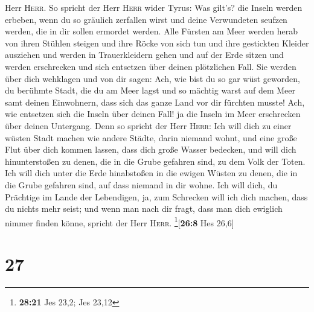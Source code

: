 Herr \textsc{Herr}.  So spricht der Herr \textsc{Herr}
wider Tyrus: Was gilt's? die Inseln werden erbeben, wenn du so gräulich
zerfallen wirst und deine Verwundeten seufzen werden, die in dir sollen
ermordet werden.  Alle Fürsten am Meer werden herab von
ihren Stühlen steigen und ihre Röcke von sich tun und ihre gestickten
Kleider ausziehen und werden in Trauerkleidern gehen und auf der Erde
sitzen und werden erschrecken und sich entsetzen über deinen plötzlichen
Fall.  Sie werden über dich wehklagen und von dir sagen:
Ach, wie bist du so gar wüst geworden, du berühmte Stadt, die du am Meer
lagst und so mächtig warst auf dem Meer samt deinen Einwohnern, dass
sich das ganze Land vor dir fürchten musste!  Ach, wie
entsetzen sich die Inseln über deinen Fall! ja die Inseln im Meer
erschrecken über deinen Untergang.  Denn so spricht der
Herr \textsc{Herr}: Ich will dich zu einer wüsten Stadt machen wie
andere Städte, darin niemand wohnt, und eine große Flut über dich kommen
lassen, dass dich große Wasser bedecken,  und will dich
hinunterstoßen zu denen, die in die Grube gefahren sind, zu dem Volk der
Toten. Ich will dich unter die Erde hinabstoßen in die ewigen Wüsten zu
denen, die in die Grube gefahren sind, auf dass niemand in dir wohne.
Ich will dich, du Prächtige im Lande der Lebendigen,  ja,
zum Schrecken will ich dich machen, dass du nichts mehr seist; und wenn
man nach dir fragt, dass man dich ewiglich nimmer finden könne, spricht
der Herr \textsc{Herr}. \footnote{\textbf{28:21} Jes 23,2; Jes 23,12}{[}\textbf{26:8}
Hes 26,6{]}

\hypertarget{section-26}{%
\section{27}\label{section-26}}

